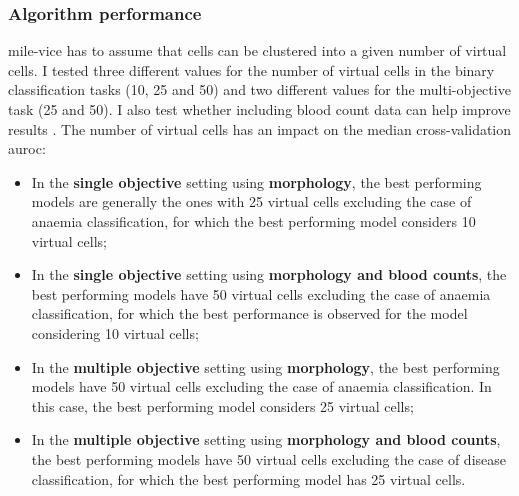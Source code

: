 \subsubsection{Algorithm performance}

\ac{mile-vice} has to assume that cells can be clustered into a given number of virtual cells. I tested three different values for the number of virtual cells in the binary classification tasks (10, 25 and 50) and two different values for the multi-objective task (25 and 50). I also test whether including blood count data can help improve results . The number of virtual cells has an impact on the median cross-validation \ac{auroc}:

\begin{itemize}
    \item In the \textbf{single objective} setting using \textbf{morphology}, the best performing models are generally the ones with 25 virtual cells excluding the case of anaemia classification, for which the best performing model considers 10 virtual cells;
    \item In the \textbf{single objective} setting using \textbf{morphology and blood counts}, the best performing models have 50 virtual cells excluding the case of anaemia classification, for which the best performance is observed for the model considering 10 virtual cells;
    \item In the \textbf{multiple objective} setting using \textbf{morphology}, the best performing models have 50 virtual cells excluding the case of anaemia classification. In this case, the best performing model considers 25 virtual cells;
    \item In the \textbf{multiple objective} setting using \textbf{morphology and blood counts}, the best performing models have 50 virtual cells excluding the case of disease classification, for which the best performing model has 25 virtual cells.
\end{itemize}

\begin{figure}[!ht]
    \label{fig:mile-vice-performance}
\end{figure}

